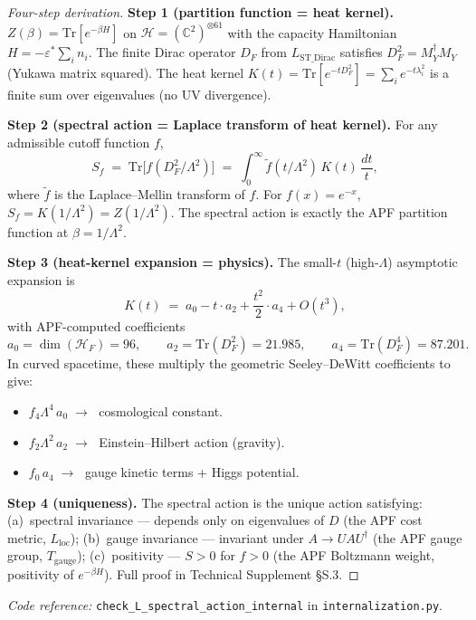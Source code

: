 \documentclass[11pt]{article}
\newcommand{\coderef}[2]{\smallskip\noindent\textit{Code reference:} \texttt{#1} in \texttt{#2}.}
\theoremstyle{definition}
\begin{document}
\begin{proof}[Four-step derivation]
\textbf{Step 1 (partition function = heat kernel).}  $Z(\beta) = \mathrm{Tr}[e^{-\beta H}]$ on $\mathcal{H} = (\mathbb{C}^2)^{\otimes 61}$ with the capacity Hamiltonian $H = -\varepsilon^* \sum_i n_i$.  The finite Dirac operator $D_F$ from $L_{\mathrm{ST\_Dirac}}$ satisfies $D_F^2 = M_Y^\dagger M_Y$ (Yukawa matrix squared).  The heat kernel $K(t) = \mathrm{Tr}[e^{-t D_F^2}] = \sum_i e^{-t \lambda_i^2}$ is a finite sum over eigenvalues (no UV divergence).

\textbf{Step 2 (spectral action = Laplace transform of heat kernel).}  For any admissible cutoff function $f$,
\[
S_f \;=\; \mathrm{Tr}\bigl[f(D_F^2/\Lambda^2)\bigr] \;=\; \int_0^\infty \tilde{f}(t/\Lambda^2) \, K(t) \, \frac{dt}{t},
\]
where $\tilde{f}$ is the Laplace--Mellin transform of $f$.  For $f(x) = e^{-x}$, $S_f = K(1/\Lambda^2) = Z(1/\Lambda^2)$.  The spectral action is exactly the APF partition function at $\beta = 1/\Lambda^2$.

\textbf{Step 3 (heat-kernel expansion = physics).}  The small-$t$ (high-$\Lambda$) asymptotic expansion is
\[
K(t) \;=\; a_0 - t \cdot a_2 + \frac{t^2}{2} \cdot a_4 + O(t^3),
\]
with APF-computed coefficients
\[
a_0 = \dim(\mathcal{H}_F) = 96, \qquad a_2 = \mathrm{Tr}(D_F^2) = 21.985, \qquad a_4 = \mathrm{Tr}(D_F^4) = 87.201.
\]
In curved spacetime, these multiply the geometric Seeley--DeWitt coefficients to give:
\begin{itemize}
\item $f_4 \Lambda^4 \, a_0 \;\to\;$ cosmological constant.
\item $f_2 \Lambda^2 \, a_2 \;\to\;$ Einstein--Hilbert action (gravity).
\item $f_0 \, a_4 \;\to\;$ gauge kinetic terms + Higgs potential.
\end{itemize}

\textbf{Step 4 (uniqueness).}  The spectral action is the unique action satisfying: (a)~spectral invariance --- depends only on eigenvalues of $D$ (the APF cost metric, $L_{\mathrm{loc}}$); (b)~gauge invariance --- invariant under $A \to U A U^\dagger$ (the APF gauge group, $T_{\mathrm{gauge}}$); (c)~positivity --- $S > 0$ for $f > 0$ (the APF Boltzmann weight, positivity of $e^{-\beta H}$).  Full proof in Technical Supplement \S S.3.
\end{proof}

\coderef{check\_L\_spectral\_action\_internal}{internalization.py}
\end{document}

